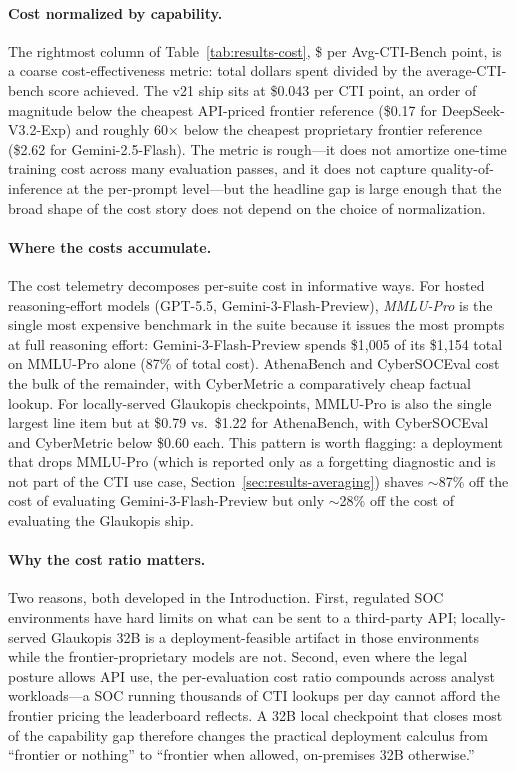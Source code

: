 \documentclass[conference]{IEEEtran}
\begin{document}
\paragraph{Cost normalized by capability.}
The rightmost column of Table~\ref{tab:results-cost}, \$ per Avg-CTI-Bench point, is a coarse cost-effectiveness metric: total dollars spent divided by the average-CTI-bench score achieved. The v21 ship sits at \$0.043 per CTI point, an order of magnitude below the cheapest API-priced frontier reference (\$0.17 for DeepSeek-V3.2-Exp) and roughly 60$\times$ below the cheapest proprietary frontier reference (\$2.62 for Gemini-2.5-Flash). The metric is rough---it does not amortize one-time training cost across many evaluation passes, and it does not capture quality-of-inference at the per-prompt level---but the headline gap is large enough that the broad shape of the cost story does not depend on the choice of normalization.

\paragraph{Where the costs accumulate.}
The cost telemetry decomposes per-suite cost in informative ways. For hosted reasoning-effort models (GPT-5.5, Gemini-3-Flash-Preview), \emph{MMLU-Pro} is the single most expensive benchmark in the suite because it issues the most prompts at full reasoning effort: Gemini-3-Flash-Preview spends \$1{,}005 of its \$1{,}154 total on MMLU-Pro alone (87\% of total cost). AthenaBench and CyberSOCEval cost the bulk of the remainder, with CyberMetric a comparatively cheap factual lookup. For locally-served Glaukopis checkpoints, MMLU-Pro is also the single largest line item but at \$0.79 vs.\ \$1.22 for AthenaBench, with CyberSOCEval and CyberMetric below \$0.60 each. This pattern is worth flagging: a deployment that drops MMLU-Pro (which is reported only as a forgetting diagnostic and is not part of the CTI use case, Section~\ref{sec:results-averaging}) shaves $\sim$87\% off the cost of evaluating Gemini-3-Flash-Preview but only $\sim$28\% off the cost of evaluating the Glaukopis ship.

\paragraph{Why the cost ratio matters.}
Two reasons, both developed in the Introduction. First, regulated SOC environments have hard limits on what can be sent to a third-party API; locally-served Glaukopis 32B is a deployment-feasible artifact in those environments while the frontier-proprietary models are not. Second, even where the legal posture allows API use, the per-evaluation cost ratio compounds across analyst workloads---a SOC running thousands of CTI lookups per day cannot afford the frontier pricing the leaderboard reflects. A 32B local checkpoint that closes most of the capability gap therefore changes the practical deployment calculus from ``frontier or nothing'' to ``frontier when allowed, on-premises 32B otherwise.''
\end{document}
